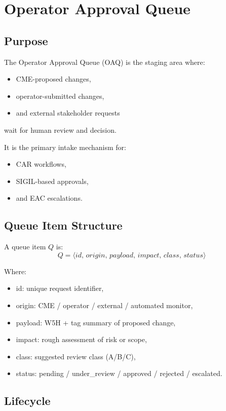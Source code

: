 \chapter{Operator Approval Queue}
\label{chap:Operator_Approval_Queue}

\section{Purpose}

The Operator Approval Queue (OAQ) is the staging area where:
\begin{itemize}
    \item CME-proposed changes,
    \item operator-submitted changes,
    \item and external stakeholder requests
\end{itemize}
wait for human review and decision.

It is the primary intake mechanism for:
\begin{itemize}
    \item CAR workflows,
    \item SIGIL-based approvals,
    \item and EAC escalations.
\end{itemize}

\section{Queue Item Structure}

A queue item $Q$ is:
\[
Q = \langle id,\, origin,\, payload,\, impact,\, class,\, status \rangle
\]

Where:
\begin{itemize}
    \item id: unique request identifier,
    \item origin: CME / operator / external / automated monitor,
    \item payload: W5H + tag summary of proposed change,
    \item impact: rough assessment of risk or scope,
    \item class: suggested review class (A/B/C),
    \item status: pending / under\_review / approved / rejected / escalated.
\end{itemize}

\section{Lifecycle}

